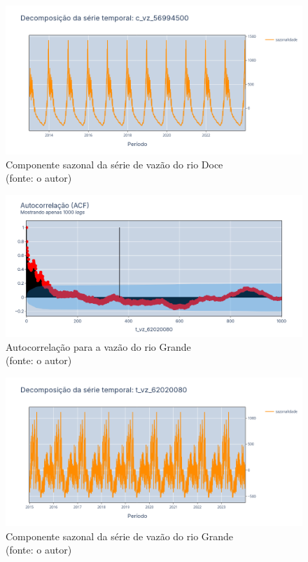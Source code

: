 \begin{figure}[!h]
	\centering
	\includegraphics[scale=0.33]{Figuras/rio_doce/sazonalidade_rio_doce.png}
	\caption{Componente sazonal da série de vazão do rio Doce\\(fonte: o autor)}
	\label{fig:sazonalidade_rio_doce}
\end{figure}

\begin{figure}[!h]
	\centering
	\includegraphics[scale=0.33]{Figuras/rio_grande/acf_rio_grande.png}
	\caption{Autocorrelação para a vazão do rio Grande\\(fonte: o autor)}
	\label{fig:acf_rio_grande}
\end{figure}

\begin{figure}[!h]
	\centering
	\includegraphics[scale=0.33]{Figuras/rio_grande/sazonalidade_rio_grande.png}
	\caption{Componente sazonal da série de vazão do rio Grande\\(fonte: o autor)}
	\label{fig:sazonalidade_rio_grande}
\end{figure}

